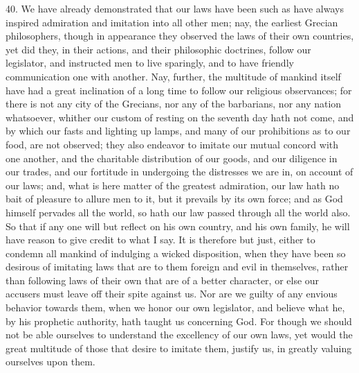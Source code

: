 40. We have already demonstrated that our laws have been such as have
always inspired admiration and imitation into all other men; nay, the
earliest Grecian philosophers, though in appearance they observed the laws
of their own countries, yet did they, in their actions, and their
philosophic doctrines, follow our legislator, and instructed men to live
sparingly, and to have friendly communication one with another. Nay,
further, the multitude of mankind itself have had a great inclination of a
long time to follow our religious observances; for there is not any city
of the Grecians, nor any of the barbarians, nor any nation whatsoever,
whither our custom of resting on the seventh day hath not come, and by
which our fasts and lighting up lamps, and many of our prohibitions as to
our food, are not observed; they also endeavor to imitate our mutual
concord with one another, and the charitable distribution of our goods,
and our diligence in our trades, and our fortitude in undergoing the
distresses we are in, on account of our laws; and, what is here matter of
the greatest admiration, our law hath no bait of pleasure to allure men to
it, but it prevails by its own force; and as God himself pervades all the
world, so hath our law passed through all the world also. So that if any
one will but reflect on his own country, and his own family, he will have
reason to give credit to what I say. It is therefore but just, either to
condemn all mankind of indulging a wicked disposition, when they have been
so desirous of imitating laws that are to them foreign and evil in
themselves, rather than following laws of their own that are of a better
character, or else our accusers must leave off their spite against us. Nor
are we guilty of any envious behavior towards them, when we honor our own
legislator, and believe what he, by his prophetic authority, hath taught
us concerning God. For though we should not be able ourselves to
understand the excellency of our own laws, yet would the great multitude
of those that desire to imitate them, justify us, in greatly valuing
ourselves upon them.

